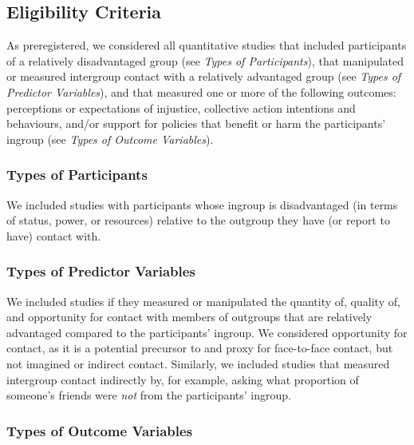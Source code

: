 \documentclass[twocolumn, 11pt, letterpaper]{article}
\begin{document}
\hypertarget{eligibility-criteria}{%
\subsection{Eligibility Criteria}\label{eligibility-criteria}}

As preregistered, we considered all quantitative studies that included
participants of a relatively disadvantaged group (see \emph{Types of
Participants}), that manipulated or measured intergroup contact with a
relatively advantaged group (see \emph{Types of Predictor Variables}),
and that measured one or more of the following outcomes: perceptions or
expectations of injustice, collective action intentions and behaviours,
and/or support for policies that benefit or harm the participants'
ingroup (see \emph{Types of Outcome Variables}).

\hypertarget{types-of-participants}{%
\subsubsection{Types of Participants}\label{types-of-participants}}

We included studies with participants whose ingroup is disadvantaged (in
terms of status, power, or resources) relative to the outgroup they have
(or report to have) contact with.

\hypertarget{types-of-predictor-variables}{%
\subsubsection{Types of Predictor
Variables}\label{types-of-predictor-variables}}

We included studies if they measured or manipulated the quantity of,
quality of, and opportunity for contact with members of outgroups that
are relatively advantaged compared to the participants' ingroup. We
considered opportunity for contact, as it is a potential precursor to
and proxy for face-to-face contact, but not imagined or indirect
contact. Similarly, we included studies that measured intergroup contact
indirectly by, for example, asking what proportion of someone's friends
were \emph{not} from the participants' ingroup.

\hypertarget{types-of-outcome-variables}{%
\subsubsection{Types of Outcome
Variables}\label{types-of-outcome-variables}}
\end{document}
